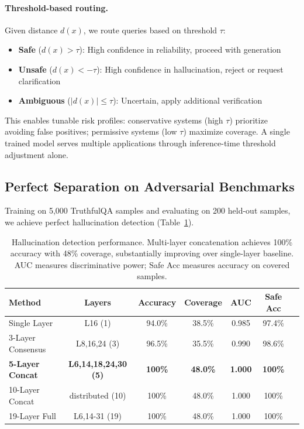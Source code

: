 \documentclass[11pt]{article}
\begin{document}
\paragraph{Threshold-based routing.} Given distance $d(x)$, we route queries based on threshold $\tau$:
\begin{itemize}
\item \textbf{Safe} ($d(x) > \tau$): High confidence in reliability, proceed with generation
\item \textbf{Unsafe} ($d(x) < -\tau$): High confidence in hallucination, reject or request clarification
\item \textbf{Ambiguous} ($|d(x)| \leq \tau$): Uncertain, apply additional verification
\end{itemize}

This enables tunable risk profiles: conservative systems (high $\tau$) prioritize avoiding false positives; permissive systems (low $\tau$) maximize coverage. A single trained model serves multiple applications through inference-time threshold adjustment alone.

\subsection{Perfect Separation on Adversarial Benchmarks}

Training on 5,000 TruthfulQA samples and evaluating on 200 held-out samples, we achieve perfect hallucination detection (Table~\ref{tab:main-results}).

\begin{table}[h]
\centering
\caption{Hallucination detection performance. Multi-layer concatenation achieves 100\% accuracy with 48\% coverage, substantially improving over single-layer baseline. AUC measures discriminative power; Safe Acc measures accuracy on covered samples.}
\label{tab:main-results}
\begin{tabular}{lcccccc}
\toprule
Method & Layers & Accuracy & Coverage & AUC & Safe Acc \\
\midrule
Single Layer & L16 (1) & 94.0\% & 38.5\% & 0.985 & 97.4\% \\
3-Layer Consensus & L8,16,24 (3) & 96.5\% & 35.5\% & 0.990 & 98.6\% \\
\textbf{5-Layer Concat} & \textbf{L6,14,18,24,30 (5)} & \textbf{100\%} & \textbf{48.0\%} & \textbf{1.000} & \textbf{100\%} \\
10-Layer Concat & distributed (10) & 100\% & 48.0\% & 1.000 & 100\% \\
19-Layer Full & L6,14-31 (19) & 100\% & 48.0\% & 1.000 & 100\% \\
\bottomrule
\end{tabular}
\end{table}
\end{document}
